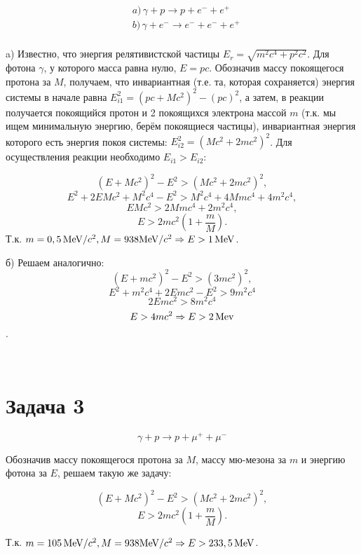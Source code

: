 \documentclass[12pt]{article}
\newcommand{\te}{\ensuremath{\Rightarrow}}
\newcommand{\st}{\ensuremath{\longrightarrow}}
\begin{document}
\begin{equation}
\begin{aligned}
&a)\, \gamma + p \st p + e^- + e^+ \\
&b)\, \gamma + e^-  \st e^- + e^- + e^+ \\
\end{aligned}
\end{equation}

a) Известно, что энергия релятивистской частицы $E_r = \sqrt{m^2c^4 + p^2c^2} $. Для фотона $ \gamma $, у которого масса равна нулю, $ E = pc $. Обозначив массу покоящегося протона за $ M $, получаем, что инвариантная (т.е. та, которая сохраняется) энергия системы в начале равна $ E_{i1}^2 = (pc + Mc^2)^2 - (pc)^2 $, а затем, в реакции  получается покоящийся протон и 2 покоящихся электрона массой $ m $ (т.к. мы ищем минимальную энергию, берём покоящиеся частицы), инвариантная энергия которого есть энергия покоя системы: $ E_{i2}^2 = (Mc^2 + 2mc^2)^2 $. Для осуществления реакции необходимо $ E_{i1} > E_{i2} $:

\[ 
(E + Mc^2)^2 - E^2 > (Mc^2 + 2mc^2)^2 ,
\]
\[ 
E^2 + 2EMc^2 + M^2c^4  - E^2> M^2c^4 + 4Mmc^4 + 4m^2c^4 ,
\]
$$
EMc^2 > 2Mmc^4 + 2m^2c^4 ,
$$
$$
E > 2mc^2 \left(1 + \dfrac{m}{M}\right).
$$
Т.к. $ m = 0,5 \, \text{MeV}/c^2, M = 938 \text{MeV}/c^2 \te E > 1 \text{\,MeV}  $.
\par
б) Решаем аналогично:
$$ (E + mc^2)^2 - E^2 > (3mc^2)^2 , $$
$$	E^2 + m^2c^4 + 2Emc^2 - E^2 > 9m^2c^4	 $$
$$ 	2Emc^2 > 8m^2c^4 $$
$$ E > 4mc^2 \te  E > 2 \text{\,Mev} $$.

\begin{center}
{} \\
\end{center} 

\section{Задача 3}

\begin{equation}
\gamma + p \st p + \mu^+ + \mu^- 
\end{equation} 

Обозначив массу покоящегося протона за $ M $, массу мю-мезона за $m$ и энергию фотона за $E$, решаем такую же задачу:  

$$ (E + Mc^2)^2 - E^2 > (Mc^2 + 2mc^2)^2 , $$
$$ E > 2mc^2 \left(1 + \dfrac{m}{M}\right). $$

Т.к. $ m = 105 \, \text{MeV}/c^2, M = 938 \text{MeV}/c^2 \te E > 233,5 \text{\,MeV}  $.
\end{document}
